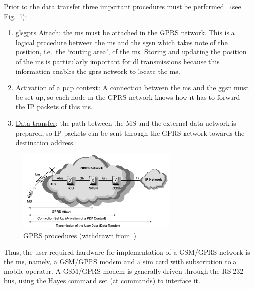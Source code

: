 Prior to the data transfer three important procedures must be
performed~\cite{sanders2003gprs} (see Fig.~\ref{fig:gprs-procedures}):
\begin{enumerate}
\item \uline{gls{gprs} Attach}: the \gls{ms} must be attached in the GPRS network. This is a logical procedure between the \gls{ms} and the \gls{sgsn}
  which takes note of the position, i.e.~the `routing area', of the \gls{ms}. Storing and updating the position of the \gls{ms} is particularly
  important for \gls{dl} transmissions because this information enables the \gls{gprs}
  network to locate the \gls{ms}.
\item \uline{Activation of a \gls{pdp} context}: A
  connection between the \gls{ms} and the \gls{ggsn} must be set up, so each
  node in the GPRS network knows how it has to forward the IP packets of this
  \gls{ms}.
\item \uline{Data transfer}: the path between the MS and the external data network is
  prepared, so IP packets can be sent through the GPRS network towards the
  destination address.
\end{enumerate}
\begin{figure}[!hbt]
\centering
    \includegraphics[width=0.7\textwidth]{./img/gprs-procedures.png}
  \caption{GPRS procedures (withdrawn from~\cite{sanders2003gprs})}%
\label{fig:gprs-procedures}
\end{figure}

Thus, the user required hardware for implementation of a GSM/GPRS network is the
\gls{me}, namely, a GSM/GPRS modem and a \gls{sim} card with subscription to a
mobile operator. A GSM/GPRS modem is generally driven through the RS-232 bus,
using the Hayes command set (\gls{at} commands) to interface it.
